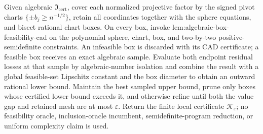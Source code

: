 Given algebraic \(\mathfrak I_{\mathrm{cert}}\), cover each normalized projective factor by the signed pivot charts \(\{\pm b_j\ge n^{-1/2}\}\), retain all coordinates together with the sphere equations, and bisect rational chart boxes.  On every box, invoke lem:algebraic-box-feasibility-cad on the polynomial sphere, chart, box, and two-by-two positive-semidefinite constraints.  An infeasible box is discarded with its CAD certificate; a feasible box receives an exact algebraic sample.  Evaluate both endpoint residual losses at that sample by algebraic-number isolation and combine the result with a global feasible-set Lipschitz constant and the box diameter to obtain an outward rational lower bound.  Maintain the best sampled upper bound, prune only boxes whose certified lower bound exceeds it, and otherwise refine until both the value gap and retained mesh are at most \(\varepsilon\).  Return the finite local certificate \(\mathscr K_{\varepsilon}\); no feasibility oracle, inclusion-oracle incumbent, semidefinite-program reduction, or uniform complexity claim is used.
